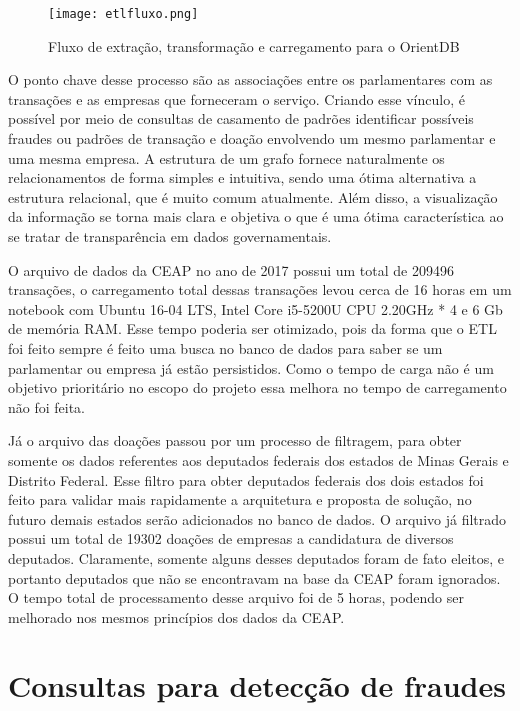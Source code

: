 \begin{figure}[H]
\centering
\texttt{[image: etlfluxo.png]}
\caption{Fluxo de extração, transformação e carregamento para o OrientDB}
\label{fig:etlfluxo}
\end{figure}

O ponto chave desse processo são as associações entre os parlamentares com as transações e as empresas que forneceram o serviço. Criando esse vínculo, é possível por meio de consultas de casamento de padrões identificar possíveis fraudes ou padrões de transação e doação envolvendo um mesmo parlamentar e uma mesma empresa. A estrutura de um grafo fornece naturalmente os relacionamentos de forma simples e intuitiva, sendo uma ótima alternativa a estrutura relacional, que é muito comum atualmente. Além disso, a visualização da informação se torna mais clara e objetiva o que é uma ótima característica ao se tratar de transparência em dados governamentais.

O arquivo de dados da CEAP no ano de 2017 possui um total de 209496 transações, o carregamento total dessas transações levou cerca de 16 horas em um notebook com Ubuntu 16-04 LTS, Intel Core i5-5200U CPU 2.20GHz * 4 e 6 Gb de memória RAM. Esse tempo poderia ser otimizado, pois da forma que o ETL foi feito sempre é feito uma busca no banco de dados para saber se um parlamentar ou empresa já estão persistidos. Como o tempo de carga não é um objetivo prioritário no escopo do projeto essa melhora no tempo de carregamento não foi feita.

Já o arquivo das doações passou por um processo de filtragem, para obter somente os dados referentes aos deputados federais dos estados de Minas Gerais e Distrito Federal. Esse filtro para obter deputados federais dos dois estados foi feito para validar mais rapidamente a arquitetura e proposta de solução, no futuro demais estados serão adicionados no banco de dados. O arquivo já filtrado possui um total de 19302 doações de empresas a candidatura de diversos deputados. Claramente, somente alguns desses deputados foram de fato eleitos, e portanto deputados que não se encontravam na base da CEAP foram ignorados. O tempo total de processamento desse arquivo foi de 5 horas, podendo ser melhorado nos mesmos princípios dos dados da CEAP.

\section{Consultas para detecção de fraudes}

